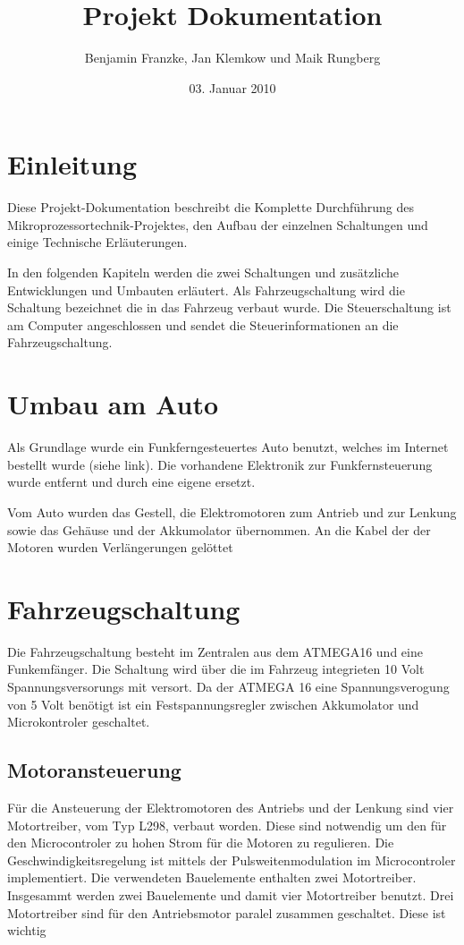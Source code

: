 \documentclass{scrartcl}
\title{Projekt Dokumentation}
\author{Benjamin Franzke, Jan Klemkow und Maik Rungberg}
\date{03. Januar 2010}
\begin{document}
\maketitle
\tableofcontents

\section{Einleitung} %
	Diese Projekt-Dokumentation beschreibt die Komplette Durchführung des Mikroprozessortechnik-Projektes,
	den Aufbau der einzelnen Schaltungen und einige Technische Erläuterungen.

	In den folgenden Kapiteln werden die zwei Schaltungen und zusätzliche Entwicklungen und Umbauten erläutert.
	Als Fahrzeugschaltung wird die Schaltung bezeichnet die in das Fahrzeug verbaut wurde.
	Die Steuerschaltung ist am Computer angeschlossen und sendet die Steuerinformationen an die Fahrzeugschaltung.

\section{Umbau am Auto} %
	Als Grundlage wurde ein Funkferngesteuertes Auto benutzt,
	welches im Internet bestellt wurde (siehe link).
	Die vorhandene Elektronik zur Funkfernsteuerung wurde entfernt und durch eine eigene ersetzt.

	Vom Auto wurden das Gestell, die Elektromotoren zum Antrieb und zur Lenkung sowie das Gehäuse und der Akkumolator übernommen.
	An die Kabel der der Motoren wurden Verlängerungen gelöttet 

\section{Fahrzeugschaltung} %
	Die Fahrzeugschaltung besteht im Zentralen aus dem ATMEGA16 und eine Funkemfänger.
	Die Schaltung wird über die im Fahrzeug integrieten 10 Volt Spannungsversorungs mit versort.
	Da der ATMEGA 16 eine Spannungsverogung von 5 Volt benötigt ist ein Festspannungsregler
	zwischen Akkumolator und Microkontroler geschaltet.

	\subsection{Motoransteuerung}
		Für die Ansteuerung der Elektromotoren des Antriebs und der Lenkung sind vier Motortreiber, vom Typ L298, verbaut worden.
		Diese sind notwendig um den für den Microcontroler zu hohen Strom für die Motoren zu regulieren.
		Die Geschwindigkeitsregelung ist mittels der Pulsweitenmodulation im Microcontroler implementiert.
		Die verwendeten Bauelemente enthalten zwei Motortreiber. Insgesammt werden zwei Bauelemente und damit vier Motortreiber benutzt.
		Drei Motortreiber sind für den Antriebsmotor paralel zusammen geschaltet. Diese ist wichtig
\end{document}
